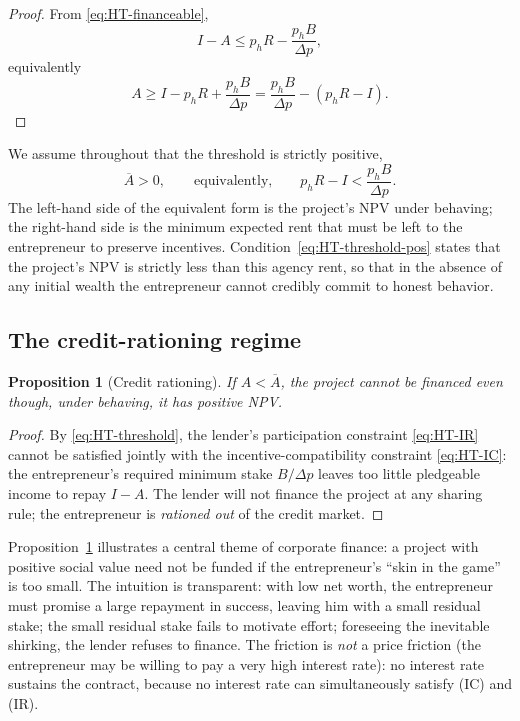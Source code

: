 \documentclass[11pt,a4paper,oneside]{book}
\def\leq{\leqslant}
\def\geq{\geqslant}
\theoremstyle{plain}
\newtheorem{proposition}[theorem]{Proposition}
\theoremstyle{definition}
\theoremstyle{remark}
\numberwithin{equation}{chapter}
\begin{document}
\begin{proof}
From \eqref{eq:HT-financeable},
\begin{equation*}
  I - A \leq p_h R - \frac{p_h B}{\Delta p},
\end{equation*}
equivalently
\begin{equation*}
  A \geq I - p_h R + \frac{p_h B}{\Delta p} = \frac{p_h B}{\Delta p} - (p_h R - I).
\end{equation*}
\end{proof}

We assume throughout that the threshold is strictly positive,
\begin{equation}\label{eq:HT-threshold-pos}
  \overline{A} > 0,
  \qquad \text{equivalently,} \qquad
  p_h R - I < \frac{p_h B}{\Delta p}.
\end{equation}
The left-hand side of the equivalent form is the project's NPV under behaving; the right-hand side is the minimum expected rent that must be left to the entrepreneur to preserve incentives.
Condition~\eqref{eq:HT-threshold-pos} states that the project's NPV is strictly less than this agency rent, so that in the absence of any initial wealth the entrepreneur cannot credibly commit to honest behavior.

\subsection{The credit-rationing regime}

\begin{proposition}[Credit rationing]\label{prop:HT-rationing}
If $A < \overline{A}$, the project cannot be financed even though, under behaving, it has positive NPV.
\end{proposition}

\begin{proof}
By \eqref{eq:HT-threshold}, the lender's participation constraint \eqref{eq:HT-IR} cannot be satisfied jointly with the incentive-compatibility constraint \eqref{eq:HT-IC}: the entrepreneur's required minimum stake $B/\Delta p$ leaves too little pledgeable income to repay $I - A$.
The lender will not finance the project at any sharing rule; the entrepreneur is \emph{rationed out} of the credit market.
\end{proof}

Proposition~\ref{prop:HT-rationing} illustrates a central theme of corporate finance: a project with positive social value need not be funded if the entrepreneur's ``skin in the game'' is too small.
The intuition is transparent: with low net worth, the entrepreneur must promise a large repayment in success, leaving him with a small residual stake; the small residual stake fails to motivate effort; foreseeing the inevitable shirking, the lender refuses to finance.
The friction is \emph{not} a price friction (the entrepreneur may be willing to pay a very high interest rate): no interest rate sustains the contract, because no interest rate can simultaneously satisfy (IC) and (IR).
\end{document}
